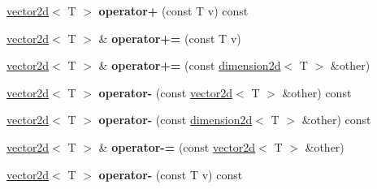 \begin{DoxyCompactItemize}
\item 
\hyperlink{classirr_1_1core_1_1vector2d}{vector2d}$<$ T $>$ {\bfseries operator+} (const T v) const \hypertarget{classirr_1_1core_1_1vector2d_a0f2a30be25c63b94cb64dc158af7d0ee}{}\label{classirr_1_1core_1_1vector2d_a0f2a30be25c63b94cb64dc158af7d0ee}

\item 
\hyperlink{classirr_1_1core_1_1vector2d}{vector2d}$<$ T $>$ \& {\bfseries operator+=} (const T v)\hypertarget{classirr_1_1core_1_1vector2d_a3f2bf3a89761ccd3f63fd252e8627d06}{}\label{classirr_1_1core_1_1vector2d_a3f2bf3a89761ccd3f63fd252e8627d06}

\item 
\hyperlink{classirr_1_1core_1_1vector2d}{vector2d}$<$ T $>$ \& {\bfseries operator+=} (const \hyperlink{classirr_1_1core_1_1dimension2d}{dimension2d}$<$ T $>$ \&other)\hypertarget{classirr_1_1core_1_1vector2d_aa05c788c6e98643e285ceaa31da30e8d}{}\label{classirr_1_1core_1_1vector2d_aa05c788c6e98643e285ceaa31da30e8d}

\item 
\hyperlink{classirr_1_1core_1_1vector2d}{vector2d}$<$ T $>$ {\bfseries operator-\/} (const \hyperlink{classirr_1_1core_1_1vector2d}{vector2d}$<$ T $>$ \&other) const \hypertarget{classirr_1_1core_1_1vector2d_a12431c746cfdefb6f4c789a610fddbd1}{}\label{classirr_1_1core_1_1vector2d_a12431c746cfdefb6f4c789a610fddbd1}

\item 
\hyperlink{classirr_1_1core_1_1vector2d}{vector2d}$<$ T $>$ {\bfseries operator-\/} (const \hyperlink{classirr_1_1core_1_1dimension2d}{dimension2d}$<$ T $>$ \&other) const \hypertarget{classirr_1_1core_1_1vector2d_af1833e3ff96a4cf3005ceb322cfc62b1}{}\label{classirr_1_1core_1_1vector2d_af1833e3ff96a4cf3005ceb322cfc62b1}

\item 
\hyperlink{classirr_1_1core_1_1vector2d}{vector2d}$<$ T $>$ \& {\bfseries operator-\/=} (const \hyperlink{classirr_1_1core_1_1vector2d}{vector2d}$<$ T $>$ \&other)\hypertarget{classirr_1_1core_1_1vector2d_a557a9942c5592d176276e1af8e6da2a4}{}\label{classirr_1_1core_1_1vector2d_a557a9942c5592d176276e1af8e6da2a4}

\item 
\hyperlink{classirr_1_1core_1_1vector2d}{vector2d}$<$ T $>$ {\bfseries operator-\/} (const T v) const \hypertarget{classirr_1_1core_1_1vector2d_a95e234978a779d84135c123e4ecd0a06}{}\label{classirr_1_1core_1_1vector2d_a95e234978a779d84135c123e4ecd0a06}


\end{DoxyCompactItemize}
